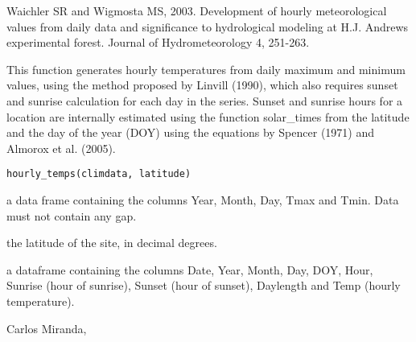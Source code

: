 \documentclass[a4paper]{book}
\begin{document}
%
\begin{References}\relax
Waichler SR and Wigmosta MS, 2003. Development of hourly meteorological
values from daily data and significance to hydrological modeling at H.J.
Andrews experimental forest. Journal of Hydrometeorology 4, 251-263.
\end{References}
%
\begin{Examples}
\end{Examples}
%
\begin{Description}\relax
This function generates hourly temperatures from daily maximum and
minimum values, using the method proposed by Linvill (1990), which also
requires sunset and sunrise calculation for each day in the series.
Sunset and sunrise hours for a location are internally estimated using 
the function solar\_times from the latitude and the day of the year (DOY)
using the equations by Spencer (1971) and Almorox et al. (2005).
\end{Description}
%
\begin{Usage}
\begin{verbatim}
hourly_temps(climdata, latitude)
\end{verbatim}
\end{Usage}
%
\begin{Arguments}
\begin{ldescription}
\item[\code{climdata}] a data frame containing the columns Year, Month, Day,
Tmax and Tmin. Data must not contain any gap.

\item[\code{latitude}] the latitude of the site, in decimal degrees.
\end{ldescription}
\end{Arguments}
%
\begin{Value}
a dataframe containing the columns Date, Year, Month, Day, DOY,
Hour, Sunrise (hour of sunrise), Sunset (hour of sunset), Daylength and
Temp (hourly temperature).
\end{Value}
%
\begin{Author}\relax
Carlos Miranda, 
\end{Author}
\end{document}
